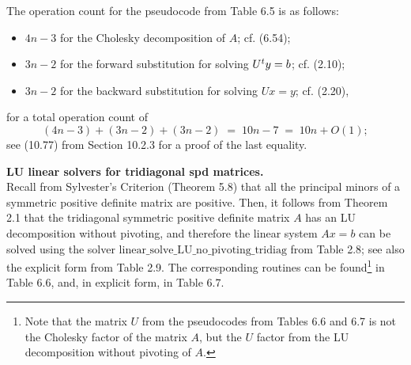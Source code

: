 \begin{table}[H]
\centering
\caption{Tridiagonal spd linear solver using Cholesky decomposition}
\end{table}

The operation count for the pseudocode from Table 6.5 is as follows:
\begin{itemize}
\item $4n-3$ for the Cholesky decomposition of $A$; cf. (6.54);
\item $3n-2$ for the forward substitution for solving $U^{t} y = b$; cf. (2.10);
\item $3n-2$ for the backward substitution for solving $Ux = y$; cf. (2.20),
\end{itemize}
for a total operation count of
\[
(4n-3) + (3n-2) + (3n-2) \;=\; 10n-7 \;=\; 10n + O(1);
\]
see (10.77) from Section 10.2.3 for a proof of the last equality.

\medskip
\noindent\textbf{LU linear solvers for tridiagonal spd matrices.}\\
Recall from Sylvester's Criterion (Theorem 5.8) that all the principal minors of a
symmetric positive definite matrix are positive. Then, it follows from Theorem 2.1
that the tridiagonal symmetric positive definite matrix $A$ has an LU decomposition
without pivoting, and therefore the linear system $Ax = b$ can be solved using the
solver $\text{linear\_solve\_LU\_no\_pivoting\_tridiag}$ from Table 2.8; see also the
explicit form from Table 2.9. The corresponding routines can be found\footnote{Note
that the matrix $U$ from the pseudocodes from Tables 6.6 and 6.7 is not the Cholesky
factor of the matrix $A$, but the $U$ factor from the LU decomposition without
pivoting of $A$.} in Table 6.6, and, in explicit form, in Table 6.7.

